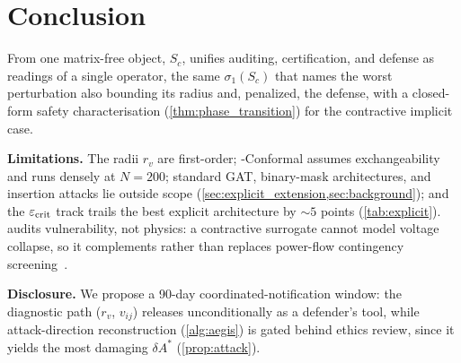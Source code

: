 \section{Conclusion}
\label{sec:conclusion}

From one matrix-free object, $S_c$, \AEGIS unifies auditing, certification, and defense as readings of a single operator, the same $\sigma_1(S_c)$ that names the worst perturbation also bounding its radius and, penalized, the defense, with a closed-form safety characterisation (\cref{thm:phase_transition}) for the contractive implicit case.

\textbf{Limitations.} The radii $r_v$ are first-order; \AEGIS-Conformal assumes exchangeability and runs densely at $N{=}200$; standard GAT, binary-mask architectures, and insertion attacks lie outside scope (\cref{sec:explicit_extension,sec:background}); and the $\varepsilon_{\mathrm{crit}}$ track trails the best explicit architecture by ${\sim}5$ points (\cref{tab:explicit}). \AEGIS audits vulnerability, not physics: a contractive surrogate cannot model voltage collapse, so it complements rather than replaces power-flow contingency screening~\cite{donon2019graph,nakiganda2023graph,varbella2024contingency}.

\textbf{Disclosure.} We propose a 90-day coordinated-notification window: the diagnostic path ($r_v$, $v_{ij}$) releases unconditionally as a defender's tool, while attack-direction reconstruction (\cref{alg:aegis}) is gated behind ethics review, since it yields the most damaging $\delta A^*$ (\cref{prop:attack}).
